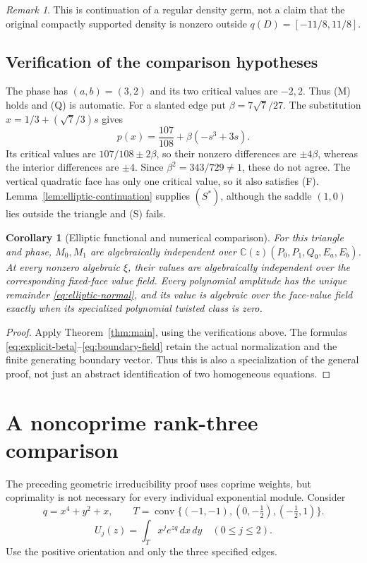 \documentclass[11pt]{article}
\numberwithin{equation}{section}
\newtheorem{corollary}[corollary]{Corollary}
\theoremstyle{definition}
\theoremstyle{remark}
\newtheorem{remark}[remark]{Remark}
\newcommand{\C}{\mathbb C}
\begin{document}
\begin{remark}
This is continuation of a regular density germ, not a claim that the
original compactly supported density is nonzero outside $q(D)=[-11/8,11/8]$.
\end{remark}

\subsection{Verification of the comparison hypotheses}
The phase has $(a,b)=(3,2)$ and its two critical values are $-2,2$.
Thus (M) holds and (Q) is automatic. For a slanted edge put
$\beta=7\sqrt7/27$. The substitution $x=1/3+(\sqrt7/3)s$ gives
\[
 p(x)=\frac{107}{108}+\beta(-s^3+3s).
\]
Its critical values are $107/108\pm2\beta$, so their nonzero differences
are $\pm4\beta$, whereas the interior differences are $\pm4$.
Since $\beta^2=343/729\ne1$, these do not agree. The vertical quadratic
face has only one critical value, so it also satisfies (F).
Lemma~\ref{lem:elliptic-continuation} supplies $(S^*)$, although the saddle
$(1,0)$ lies outside the triangle and (S) fails.

\begin{corollary}[Elliptic functional and numerical comparison]
\label{thm:intro-elliptic}\label{thm:elliptic-main}\label{thm:values}
For this triangle and phase, $M_0,M_1$ are algebraically independent over
$\C(z)(P_0,P_1,Q_0,E_a,E_b)$. At every nonzero algebraic $\xi$, their values
are algebraically independent over the corresponding fixed-face value
field. Every polynomial amplitude has the unique remainder
\eqref{eq:elliptic-normal}, and its value is algebraic over the face-value
field exactly when its specialized polynomial twisted class is zero.
\end{corollary}
\begin{proof}
Apply Theorem~\ref{thm:main}, using the verifications above. The formulas
\eqref{eq:explicit-beta}--\eqref{eq:boundary-field} retain the actual
normalization and the finite generating boundary vector. Thus this is
also a specialization of the general proof, not just an abstract
identification of two homogeneous equations.
\end{proof}
\section{A noncoprime rank-three comparison}\label{sec:noncoprime}

The preceding geometric irreducibility proof uses coprime weights, but
coprimality is not necessary for every individual exponential module.
Consider
\[
 q=x^4+y^2+x,\qquad
 T=\operatorname{conv}\{(-1,-1),(0,-\tfrac12),(-\tfrac12,1)\}.
\]
\[
 U_j(z)=\int_T x^j e^{zq}\,dx\,dy\quad(0\le j\le2).
\]
Use the positive orientation and only the three specified edges.
\end{document}
